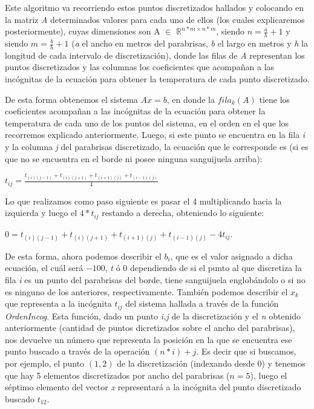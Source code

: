 \documentclass[10pt, a4paper]{article}
\begin{document}
	Este algoritmo va recorriendo estos puntos discretizados hallados y colocando en la matriz \textit{A} determinados valores para cada uno de ellos (los cuales explicaremos posteriormente), cuyas dimensiones son A $\in$ $\mathbb{R}^{n*m\times n*m}$, siendo $n=\frac{a}{h}+1$ y siendo $m=\frac{b}{h}+1$ (\textit{a} el ancho en metros del parabrisas, \textit{b} el largo en metros y \textit{h} la longitud de cada intervalo de discretizaci\'on), donde las filas de \textit{A} representan los puntos discretizados y las columnas los coeficientes que acompañan a las inc\'ognitas de la ecuaci\'on para obtener la temperatura de cada punto discretizado. 

	De esta forma obtenemos el sistema $Ax=b$, en donde la $fila_{k}(A)$ tiene los coeficientes acompañan a las inc\'ognitas de la ecuaci\'on para obtener la temperatura de cada uno de los puntos del sistema, en el orden en el que los recorremos explicado anteriormente. Luego, si este punto se encuentra en la fila \textit{i} y la columna \textit{j} del parabrisas discretizado, la ecuaci\'on que le corresponde es (si es que no se encuentra en el borde ni posee ninguna sanguijuela arriba):

\begin{center}
	$t_{ij}=\frac{t_{(i)(j-1)}+t_{(i)(j+1)}+t_{(i+1)(j)}+t_{(i-1)(j)}}{4}$
\end{center}

Lo que realizamos como paso siguiente es pasar el 4 multiplicando hacia la izquierda y luego el $4*t_{ij}$ restando a derecha, obteniendo lo siguiente:
\begin{center}
	$0=t_{(i)(j-1)}+t_{(i)(j+1)}+t_{(i+1)(j)}+t_{(i-1)(j)}-4t_{ij}$. 
\end{center}

	De esta forma, ahora podemos describir el $b_{i}$, que es el valor asignado a dicha ecuaci\'on, el cu\'al ser\'a $-100$, \textit{t} \'o 0 dependiendo de si el punto al que discretiza la fila \textit{i} es un punto del parabrisas del borde, tiene sanguijuela englob\'andolo o si no es ninguno de los anteriores, respectivamente. Tambi\'en podemos describir el $x_{k}$ que representa a la inc\'ognita $t_{ij}$ del sistema hallada a trav\'es de la funci\'on \textit{OrdenIncog}. Esta funci\'on, dado un punto \textit{i,j} de la discretizaci\'on y el \textit{n} obtenido anteriormente (cantidad de puntos dicretizados sobre el ancho del parabrisas), nos devuelve un n\'umero que representa la posici\'on en la que se encuentra ese punto buscado a trav\'es de la operaci\'on $(n*i)+j$. Es decir que si buscamos, por ejemplo, el punto $(1,2)$ de la discretizaci\'on (indexando desde 0) y tenemos que hay 5 elementos discretizados por ancho del parabrisas ($n=5$), luego el s\'eptimo elemento del vector \textit{x} representar\'a a la inc\'ognita del punto discretizado buscado $t_{12}$.
	
\end{document}
